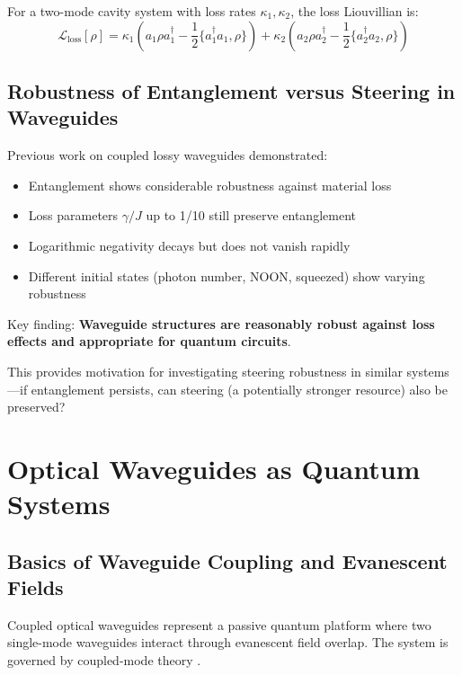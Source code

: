 For a two-mode cavity system with loss rates $\kappa_1, \kappa_2$, the loss Liouvillian is:
\begin{equation}
\mathcal{L}_{\text{loss}}[\rho] = \kappa_1\left(a_1\rho a_1^\dagger - \frac{1}{2}\{a_1^\dagger a_1, \rho\}\right) + \kappa_2\left(a_2\rho a_2^\dagger - \frac{1}{2}\{a_2^\dagger a_2, \rho\}\right)
\end{equation}

\subsection{Robustness of Entanglement versus Steering in Waveguides}

Previous work on coupled lossy waveguides \cite{RaiDasAgarwal2010} demonstrated:

\begin{itemize}
	\item Entanglement shows considerable robustness against material loss
	\item Loss parameters $\gamma/J$ up to 1/10 still preserve entanglement
	\item Logarithmic negativity decays but does not vanish rapidly
	\item Different initial states (photon number, NOON, squeezed) show varying robustness
\end{itemize}

Key finding: \textbf{Waveguide structures are reasonably robust against loss effects and appropriate for quantum circuits}.

This provides motivation for investigating steering robustness in similar systems—if entanglement persists, can steering (a potentially stronger resource) also be preserved?

\section{Optical Waveguides as Quantum Systems}

\subsection{Basics of Waveguide Coupling and Evanescent Fields}

Coupled optical waveguides represent a passive quantum platform where two single-mode waveguides interact through evanescent field overlap. The system is governed by coupled-mode theory \cite{laiNonclassicalFieldsLinear1991}.

